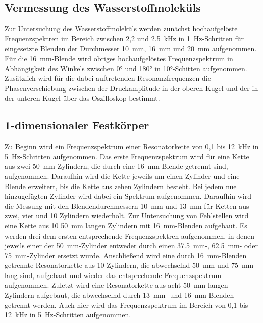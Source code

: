     \subsection{Vermessung des Wasserstoffmoleküls}
        Zur Untersuchung des Wasserstoffmoleküls werden zunächst hochaufgelöste Frequenzspektren im Bereich zwischen 2,2 und \SI{2.5}{\kilo\hertz} in \SI{1}{\hertz}-Schritten für eingesetzte Blenden der 
        Durchmesser \SI{10}{\milli\metre}, \SI{16}{\milli\metre} und \SI{20}{\milli\metre} aufgenommen.\newline
        Für die \SI{16}{\milli\metre}-Blende wird obriges hochaufgelöstes Frequenzspektrum in Abhängigkeit des Winkels zwischen 0° und 180° in 10°-Schitten aufgenommen. Zusätzlich wird für die dabei 
        auftretenden Resonanzfrequenzen die Phasenverschiebung zwischen der Druckamplitude in der oberen Kugel und der in der unteren Kugel über das Oszilloskop bestimmt.
        
    \subsection{1-dimensionaler Festkörper}
        Zu Beginn wird ein Frequenzspektrum einer Resonatorkette von 0,1 bis \SI{12}{\kilo\hertz} in \SI{5}{\hertz}-Schritten aufgenommen. Das erste Frequenzspektrum wird für eine Kette aus zwei 
        \SI{50}{\milli\metre}-Zylindern, die durch eine \SI{16}{\milli\metre}-Blende getrennt sind, aufgenommen. Daraufhin wird die Kette jeweils um einen Zylinder und eine Blende erweitert, bis die Kette aus 
        zehen Zylindern besteht. Bei jedem nue hinzugefügten Zylinder wird dabei ein Spektrum aufgenommen.\newline
        Daraufhin wird die Messung mit den Blendendurchmessern \SI{10}{\milli\metre} und \SI{13}{\milli\metre} für Ketten aus zwei, vier und 10 Zylindern wiederholt.\newline
        Zur Untersuchung von Fehlstellen wird eine Kette aus 10 \SI{50}{\milli\metre} langen Zylindern mit \SI{16}{\milli\metre}-Blenden aufgebaut. Es werden drei dem ersten entsprechende Frequenzspektren 
        aufgenommen, in denen jeweils einer der \SI{50}{\milli\metre}-Zylinder entweder durch einen \SI{37.5}{\milli\metre}-, \SI{62.5}{\milli\metre}- oder \SI{75}{\milli\metre}-Zylinder ersetzt wurde.\newline
        Anschließend wird eine durch \SI{16}{\milli\metre}-Blenden getrennte Resonatorkette aus 10 Zylindern, die abwechselnd \SI{50}{\milli\metre} und \SI{75}{\milli\metre} lang sind, aufgebaut und wieder 
        das entsprechende Frequenzspektrum aufgenommen.\newline
        Zuletzt wird eine Resonatorkette aus acht \SI{50}{\milli\metre} langen Zylindern aufgebaut, die abwechselnd durch \SI{13}{\milli\metre}- und \SI{16}{\milli\metre}-Blenden getrennt werden. Auch hier 
        wird das Frequenzspektrum im Bereich von 0,1 bis \SI{12}{\kilo\hertz} in \SI{5}{\hertz}-Schritten aufgenommen.


        
        

        
